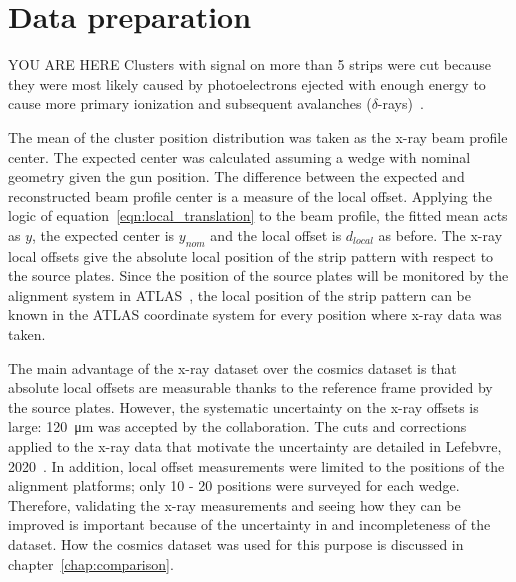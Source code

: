 \section{Data preparation}
YOU ARE HERE
Clusters with signal on more than 5 strips were cut because they were most likely caused by photoelectrons ejected with enough energy to cause more primary ionization and subsequent avalanches ($\delta$-rays)~\cite{lefebvre_precision_2020}.

The mean of the cluster position distribution was taken as the x-ray beam profile center. The expected center was calculated assuming a wedge with nominal geometry given the gun position. The difference between the expected and reconstructed beam profile center is a measure of the local offset. Applying the logic of equation~\ref{eqn:local_translation} to the beam profile, the fitted mean acts as $y$, the expected center is $y_{nom}$ and the local offset is $d_{local}$ as before. The x-ray local offsets  give the absolute local position of the strip pattern with respect to the source plates. Since the position of the source plates will be monitored by the alignment system in ATLAS~\cite{nsw_tdr}, the local position of the strip pattern can be known in the ATLAS coordinate system for every position where x-ray data was taken.

The main advantage of the x-ray dataset over the cosmics dataset is that absolute local offsets are measurable thanks to the reference frame provided by the source plates. However, the systematic uncertainty on the x-ray offsets is large: \SI{120}{\micro\meter} was accepted by the collaboration. The cuts and corrections applied to the x-ray data that motivate the uncertainty are detailed in Lefebvre, 2020~\cite{lefebvre_precision_2020}. In addition, local offset measurements were limited to the positions of the alignment platforms; only 10 - 20 positions were surveyed for each wedge. Therefore, validating the x-ray measurements and seeing how they can be improved is important because of the uncertainty in and incompleteness of the dataset. How the cosmics dataset was used for this purpose is discussed in chapter~\ref{chap:comparison}. 